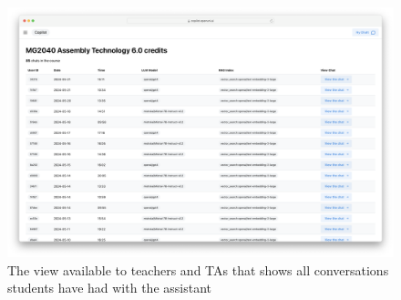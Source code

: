 \begin{figure}[H]
    \centering
    \includegraphics[width=\textwidth]{content/figures/assets/20-list-of-conversations.png}
    \caption{The view available to teachers and TAs that shows all conversations students have had with the assistant}
    \label{fig:list_of_conversations}
\end{figure}
